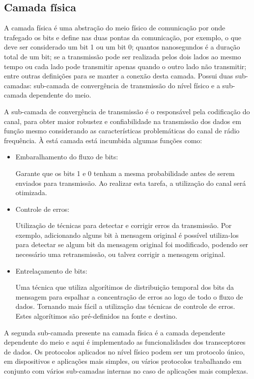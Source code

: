 \subsection{Camada física}
A camada física é uma abstração do meio físico de comunicação por onde trafegado os bits e define nas duas pontas da comunicação, por exemplo, o que deve ser considerado um bit 1 ou um bit 0; quantos nanosegundos é a duração total de um bit; se a transmissão pode ser realizada pelos dois lados ao mesmo tempo ou cada lado pode transmitir apenas quando o outro lado não transmitir; entre outras definições para se manter a conexão desta camada. Possui duas sub-camadas: sub-camada de convergência de transmissão do nível físico e a sub-camada dependente do meio.

A sub-camada de convergência de transmissão é o responsável pela codificação do canal, para obter maior robustez e confiabilidade na transmissão dos dados em função mesmo considerando as características problemáticas do canal de rádio frequência. À está camada está incumbida algumas funções como:
\begin{itemize}
      \item Embaralhamento do fluxo de bits:

            Garante que os bits 1 e 0 tenham a mesma probabilidade antes de serem enviados para transmissão. Ao realizar esta tarefa, a utilização do canal será otimizada.
      \item Controle de erros:

            Utilização de técnicas para detectar e corrigir erros da transmissão. Por exemplo, adicionando alguns bit à mensagem original é possível utiliza-los para detectar se algum bit da mensagem original foi modificado, podendo ser necessário uma retransmissão, ou talvez corrigir a mensagem original.
      \item Entrelaçamento de bits:

            Uma técnica que utiliza algorítimos de distribuição temporal dos bits da mensagem para espalhar a concentração de erros ao logo de todo o fluxo de dados. Tornando mais fácil a utilização das técnicas de controle de erros. Estes algorítimos são pré-definidos na fonte e destino.
\end{itemize}

A segunda sub-camada presente na camada física é a camada dependente dependente do meio e aqui é implementado as funcionalidades dos transceptores de dados. Os protocolos aplicados no nível físico podem ser um protocolo único, em dispositivos e aplicações mais simples, ou vários protocolos trabalhando em conjunto com vários sub-camadas internas no caso de aplicações mais complexas.


